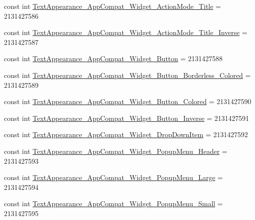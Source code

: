 \begin{DoxyCompactItemize}
\item 
const int \mbox{\hyperlink{class_f_w_p_s___app_1_1_droid_1_1_resource_1_1_style_a596295e901d70e8352d9b1cc9a62d284}{Text\+Appearance\+\_\+\+App\+Compat\+\_\+\+Widget\+\_\+\+Action\+Mode\+\_\+\+Title}} = 2131427586
\item 
const int \mbox{\hyperlink{class_f_w_p_s___app_1_1_droid_1_1_resource_1_1_style_a03f96a6a3f22a4af93b34c654cf49a0d}{Text\+Appearance\+\_\+\+App\+Compat\+\_\+\+Widget\+\_\+\+Action\+Mode\+\_\+\+Title\+\_\+\+Inverse}} = 2131427587
\item 
const int \mbox{\hyperlink{class_f_w_p_s___app_1_1_droid_1_1_resource_1_1_style_a41ef18f5be8bb786b3c356e781a5b439}{Text\+Appearance\+\_\+\+App\+Compat\+\_\+\+Widget\+\_\+\+Button}} = 2131427588
\item 
const int \mbox{\hyperlink{class_f_w_p_s___app_1_1_droid_1_1_resource_1_1_style_a6577e626aa9a31e7e0d8b918705664e7}{Text\+Appearance\+\_\+\+App\+Compat\+\_\+\+Widget\+\_\+\+Button\+\_\+\+Borderless\+\_\+\+Colored}} = 2131427589
\item 
const int \mbox{\hyperlink{class_f_w_p_s___app_1_1_droid_1_1_resource_1_1_style_ada0bf14472e9effd809fa34276941156}{Text\+Appearance\+\_\+\+App\+Compat\+\_\+\+Widget\+\_\+\+Button\+\_\+\+Colored}} = 2131427590
\item 
const int \mbox{\hyperlink{class_f_w_p_s___app_1_1_droid_1_1_resource_1_1_style_a300f06d4c31365abf97235bdd5f1206f}{Text\+Appearance\+\_\+\+App\+Compat\+\_\+\+Widget\+\_\+\+Button\+\_\+\+Inverse}} = 2131427591
\item 
const int \mbox{\hyperlink{class_f_w_p_s___app_1_1_droid_1_1_resource_1_1_style_a9d9a6925ff89e3d544c44fe9e693173d}{Text\+Appearance\+\_\+\+App\+Compat\+\_\+\+Widget\+\_\+\+Drop\+Down\+Item}} = 2131427592
\item 
const int \mbox{\hyperlink{class_f_w_p_s___app_1_1_droid_1_1_resource_1_1_style_a6ca5e4e9f92478a5333189490818a8e2}{Text\+Appearance\+\_\+\+App\+Compat\+\_\+\+Widget\+\_\+\+Popup\+Menu\+\_\+\+Header}} = 2131427593
\item 
const int \mbox{\hyperlink{class_f_w_p_s___app_1_1_droid_1_1_resource_1_1_style_ada45a2f87fce5bc8783c17a166d859b1}{Text\+Appearance\+\_\+\+App\+Compat\+\_\+\+Widget\+\_\+\+Popup\+Menu\+\_\+\+Large}} = 2131427594
\item 
const int \mbox{\hyperlink{class_f_w_p_s___app_1_1_droid_1_1_resource_1_1_style_a6926291a51a72c1e8bb0fefaeee8aad0}{Text\+Appearance\+\_\+\+App\+Compat\+\_\+\+Widget\+\_\+\+Popup\+Menu\+\_\+\+Small}} = 2131427595
\item 

\end{DoxyCompactItemize}
